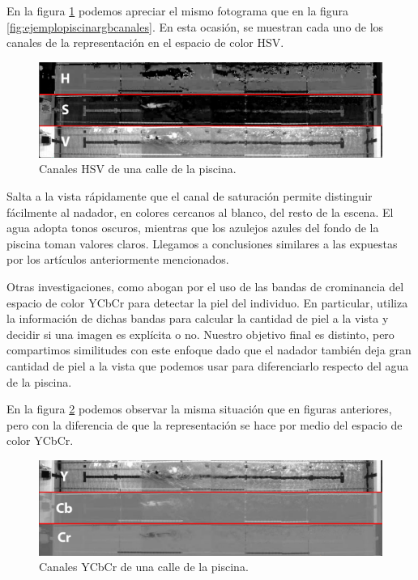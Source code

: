En la figura \ref{fig:ejemplopiscinahsvcanales} podemos apreciar el mismo fotograma que en la figura \ref{fig:ejemplopiscinargbcanales}. En esta ocasión, se muestran cada uno de los canales de la representación en el espacio de color HSV. 

\begin{figure}[h!]
    \centering
    \includegraphics[width=1\textwidth,height=1\textheight,keepaspectratio]{imagenes/parte_BS/HSV_LANE.png}    
    \caption{Canales HSV de una calle de la piscina.}
    \label{fig:ejemplopiscinahsvcanales}
\end{figure}

Salta a la vista rápidamente que el canal de saturación  permite distinguir fácilmente al nadador, en colores cercanos al blanco, del resto de la escena. El agua adopta tonos oscuros, mientras que los azulejos azules del fondo de la piscina toman valores claros. Llegamos a conclusiones similares a las expuestas por los artículos anteriormente mencionados. 

Otras investigaciones, como \cite{ycbcrskini} \cite{skinvariousspaces} \cite{swimmerartii} abogan por el uso de las bandas de crominancia del espacio de color YCbCr para detectar la piel del individuo. En particular, \cite{ycbcrskini} utiliza la información de dichas bandas para calcular la cantidad de piel a la vista y decidir si una imagen es explícita o no. Nuestro objetivo final es distinto, pero compartimos similitudes con este enfoque dado que el nadador también deja gran cantidad de piel a la vista que podemos usar para diferenciarlo respecto del agua de la piscina.

En la figura \ref{fig:ejemplopiscinaycbcrcanales} podemos observar la misma situación que en figuras anteriores, pero con la diferencia de que la representación se hace por medio del espacio de color YCbCr. 

\begin{figure}[h!]
    \centering
    \includegraphics[width=1\textwidth,height=1\textheight,keepaspectratio]{imagenes/parte_BS/YCBCR_LANE.png}
    \caption{Canales YCbCr de una calle de la piscina.}
    \label{fig:ejemplopiscinaycbcrcanales}
\end{figure}

